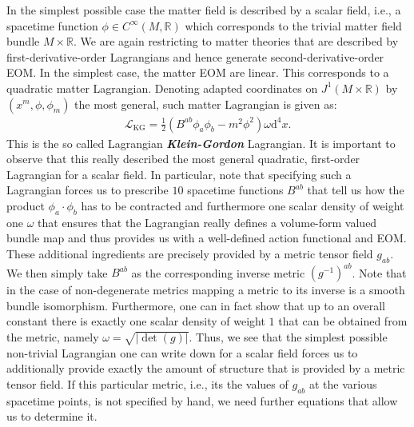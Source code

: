 In the simplest possible case the matter field is described by a scalar field, i.e., a spacetime function $\phi \in C^{\infty}(M,\mathbb{R})$ which corresponds to the trivial matter field bundle $M \times \mathbb{R}$. We are again restricting to matter theories that are described by first-derivative-order Lagrangians and hence generate second-derivative-order EOM. In the simplest case, the matter EOM are linear. This corresponds to a quadratic matter Lagrangian. Denoting adapted coordinates on $J^1(M \times \mathbb{R})$ by $(x^m,\phi,\phi_m)$ the most general, such matter Lagrangian is given as:
\begin{align}\label{KGL}
    \mathcal{L}_{\text{KG}} = \frac{1}{2} \left ( B^{ab} \phi_a \phi_b - m^2 \phi^2\right )\omega \mathrm{d}^4x.
\end{align}
This is the so called Lagrangian \textit{\textbf{Klein-Gordon}} Lagrangian. It is important to observe that this really described the most general quadratic, first-order Lagrangian for a scalar field. 
In particular, note that specifying such a Lagrangian forces us to prescribe $10$ spacetime functions $B^{ab}$ that tell us how the product $\phi_a\cdot \phi_b$ has to be contracted and furthermore one scalar density of weight one $\omega$ that ensures that the Lagrangian really defines a volume-form valued bundle map and thus provides us with a well-defined action functional and EOM.
These additional ingredients are precisely provided by a metric tensor field $g_{ab}$. We then simply take $B^{ab}$ as the corresponding inverse metric $(g^{-1})^{ab}$. Note that in the case of non-degenerate metrics mapping a metric to its inverse is a smooth bundle isomorphism. Furthermore, one can in fact show that up to an overall constant there is exactly one scalar density of weight $1$ that can be obtained from the metric, namely $\omega = \sqrt{ \vert \operatorname{det}(g) \vert }$. 
Thus, we see that the simplest possible non-trivial Lagrangian one can write down for a scalar field forces us to additionally provide exactly the amount of structure that is provided by a metric tensor field. If this particular metric, i.e., its the values of $g_{ab}$ at the various spacetime points, is not specified by hand, we need further equations that allow us to determine it.  

